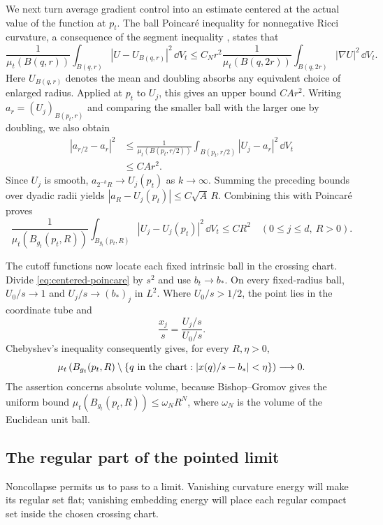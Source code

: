 We next turn average gradient control into an estimate centered at the
actual value of the function at $p_t$.  The ball Poincar\'e inequality
for nonnegative Ricci curvature, a consequence of the segment inequality
\cite{CheegerColdingSegment}, states that
\[
 \frac1{\mu_t(B(q,r))}\int_{B(q,r)}|U-U_{B(q,r)}|^2\,\dd V_t
 \le C_Nr^2\frac1{\mu_t(B(q,2r))}
                       \int_{B(q,2r)}|\nabla U|^2\,\dd V_t.
\]
Here $U_{B(q,r)}$ denotes the mean and doubling absorbs any equivalent
choice of enlarged radius.  Applied at $p_t$ to $U_j$, this gives an
upper bound $CA r^2$.  Writing $a_r=(U_j)_{B(p_t,r)}$ and comparing the
smaller ball with the larger one by doubling, we also obtain
\[
 \begin{split}
 |a_{r/2}-a_r|^2
 &\le\frac1{\mu_t(B(p_t,r/2))}
           \int_{B(p_t,r/2)}|U_j-a_r|^2\,\dd V_t\\
 &\le C A r^2.
 \end{split}
\]
Since $U_j$ is smooth, $a_{2^{-k}R}\to U_j(p_t)$ as $k\to\infty$.
Summing the preceding bounds over dyadic radii yields
$|a_R-U_j(p_t)|\le C\sqrt A\,R$.  Combining this with Poincar\'e proves
\begin{equation}
 \frac1{\mu_t(B_{g_t}(p_t,R))}
   \int_{B_{g_t}(p_t,R)}|U_j-U_j(p_t)|^2\,\dd V_t
       \le C R^2
 \quad(0\le j\le d,\ R>0).
 \label{eq:centered-poincare}
\end{equation}

The cutoff functions now locate each fixed intrinsic ball in the
crossing chart.  Divide \eqref{eq:centered-poincare} by $s^2$ and use
$b_t\to b_*$.  On every fixed-radius ball, $U_0/s\to1$ and
$U_j/s\to(b_*)_j$ in $L^2$.  Where $U_0/s>1/2$, the point lies in the
coordinate tube and
\[
 \frac{x_j}{s}=\frac{U_j/s}{U_0/s}.
\]
Chebyshev's inequality consequently gives, for every $R,\eta>0$,
\begin{equation}
 \mu_t\left(B_{g_t}(p_t,R)\setminus
     \{q\hbox{ in the chart}:|x(q)/s-b_*|<\eta\}\right)
          \longrightarrow0.
 \label{eq:coordinate-concentration}
\end{equation}
The assertion concerns absolute volume, because Bishop--Gromov gives
the uniform bound
$\mu_t(B_{g_t}(p_t,R))\le\omega_NR^N$, where $\omega_N$ is the volume
of the Euclidean unit ball.

\subsection{The regular part of the pointed limit}

Noncollapse permits us to pass to a limit.  Vanishing curvature energy
will make its regular set flat; vanishing embedding energy will place
each regular compact set inside the chosen crossing chart.

